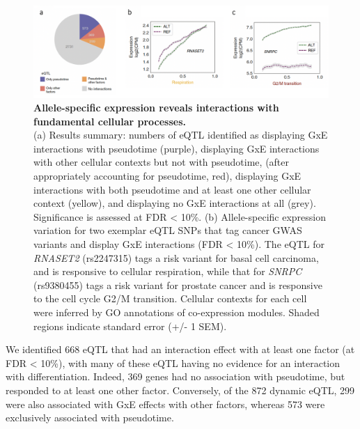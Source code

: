 \begin{figure}[h]
\centering
\includegraphics[width=15.5cm]{Chapter4/Fig/endodiff_GxE.png}
\caption[Allele-specific expression reveals interactions with fundamental cellular processes]{\textbf{Allele-specific expression reveals interactions with fundamental cellular processes.}\\
(a) Results summary: numbers of eQTL identified as displaying GxE interactions with pseudotime (purple), displaying GxE interactions with other cellular contexts but not with pseudotime, (after appropriately accounting for pseudotime, red), displaying GxE interactions with both pseudotime and at least one other cellular context (yellow), and displaying no GxE interactions at all (grey). 
Significance is assessed at FDR < 10\%.
(b) Allele-specific expression variation for two exemplar eQTL SNPs that tag cancer GWAS variants and display GxE interactions (FDR < 10\%). 
The eQTL for \textit{RNASET2} (rs2247315) tags a risk variant for basal cell carcinoma, and is responsive to cellular respiration, while that for \textit{SNRPC} (rs9380455) tags a risk variant for prostate cancer and is responsive to the cell cycle G2/M transition. 
Cellular contexts for each cell were inferred by GO annotations of co-expression modules. 
Shaded regions indicate standard error (+/- 1 SEM).}
\label{fig:endodiff_gxe}
\end{figure}

We identified 668 eQTL that had an interaction effect with at least one factor (at FDR < 10\%), with many of these eQTL having no evidence for an interaction with differentiation.
Indeed, 369 genes had no association with pseudotime, but responded to at least one other factor. 
Conversely, of the 872 dynamic eQTL, 299 were also associated with GxE effects with other factors, whereas 573 were exclusively associated with pseudotime.\\


